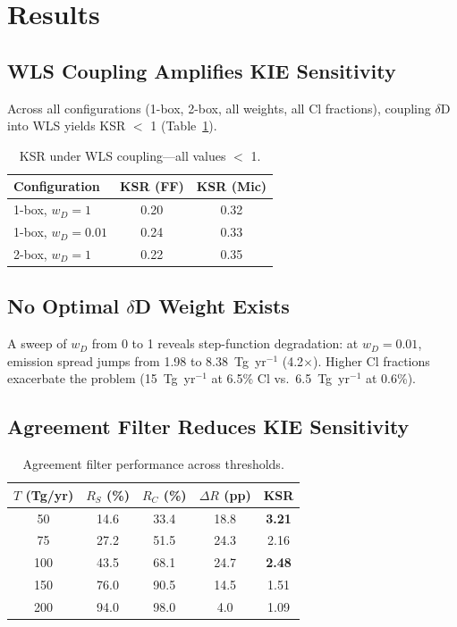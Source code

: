 \documentclass[11pt,twocolumn]{article}
\begin{document}
\section{Results}

\subsection{WLS Coupling Amplifies KIE Sensitivity}

Across all configurations (1-box, 2-box, all weights, all Cl fractions), coupling $\delta$D into WLS yields KSR $<$ 1 (Table~\ref{tab:wls}).

\begin{table}[h]
\caption{KSR under WLS coupling---all values $<$ 1.}
\label{tab:wls}
\centering
\begin{tabular}{lcc}
\toprule
Configuration & KSR (FF) & KSR (Mic) \\
\midrule
1-box, $w_D=1$ & 0.20 & 0.32 \\
1-box, $w_D=0.01$ & 0.24 & 0.33 \\
2-box, $w_D=1$ & 0.22 & 0.35 \\
\bottomrule
\end{tabular}
\end{table}

\subsection{No Optimal $\delta$D Weight Exists}

A sweep of $w_D$ from 0 to 1 reveals step-function degradation: at $w_D = 0.01$, emission spread jumps from 1.98 to 8.38~Tg~yr$^{-1}$ (4.2$\times$). Higher Cl fractions exacerbate the problem (15~Tg~yr$^{-1}$ at 6.5\% Cl vs.\ 6.5~Tg~yr$^{-1}$ at 0.6\%).

\subsection{Agreement Filter Reduces KIE Sensitivity}

\begin{table}[h]
\caption{Agreement filter performance across thresholds.}
\label{tab:agree}
\centering
\footnotesize
\begin{tabular}{ccccc}
\toprule
$T$ (Tg/yr) & $R_S$ (\%) & $R_C$ (\%) & $\Delta R$ (pp) & KSR \\
\midrule
50 & 14.6 & 33.4 & 18.8 & \textbf{3.21} \\
75 & 27.2 & 51.5 & 24.3 & 2.16 \\
100 & 43.5 & 68.1 & 24.7 & \textbf{2.48} \\
150 & 76.0 & 90.5 & 14.5 & 1.51 \\
200 & 94.0 & 98.0 & 4.0 & 1.09 \\
\bottomrule
\end{tabular}
\end{table}
\end{document}
